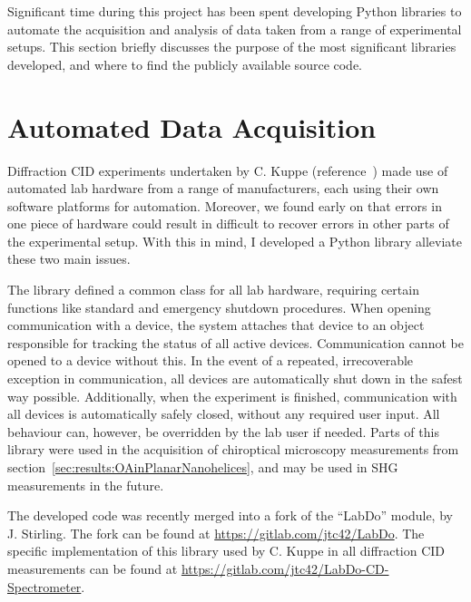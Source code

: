 Significant time during this project has been spent developing Python libraries to automate the acquisition and analysis of data taken from a range of experimental setups. This section briefly discusses the purpose of the most significant libraries developed, and where to find the publicly available source code.

\section{Automated Data Acquisition}\label{sec:appendix:labdo}
Diffraction CID experiments undertaken by C. Kuppe (reference~\cite{Kuppe2018}) made use of automated lab hardware from a range of manufacturers, each using their own software platforms for automation. Moreover, we found early on that errors in one piece of hardware could result in difficult to recover errors in other parts of the experimental setup. With this in mind, I developed a Python library alleviate these two main issues. 

The library defined a common class for all lab hardware, requiring certain functions like standard and emergency shutdown procedures. When opening communication with a device, the system attaches that device to an object responsible for tracking the status of all active devices. Communication cannot be opened to a device without this. In the event of a repeated, irrecoverable exception in communication, all devices are automatically shut down in the safest way possible. Additionally, when the experiment is finished, communication with all devices is automatically safely closed, without any required user input. All behaviour can, however, be overridden by the lab user if needed. 
Parts of this library were used in the acquisition of chiroptical microscopy measurements from section~\ref{sec:results:OAinPlanarNanohelices}, and may be used in SHG measurements in the future.

The developed code was recently merged into a fork of the ``LabDo'' module, by J. Stirling. The fork can be found at \url{https://gitlab.com/jtc42/LabDo}.
The specific implementation of this library used by C. Kuppe in all diffraction CID measurements can be found at \url{https://gitlab.com/jtc42/LabDo-CD-Spectrometer}.

